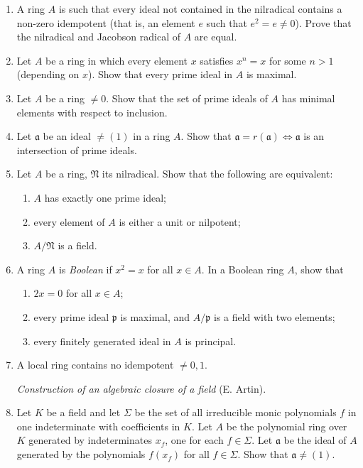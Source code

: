 \begin{enumerate}
\item A ring $A$ is such that every ideal not contained in the nilradical contains a non-zero idempotent (that is, an element $e$ such that $e^2=e\neq0$). Prove that the nilradical and Jacobson radical of $A$ are equal.

\item Let $A$ be a ring in which every element $x$ satisfies $x^n=x$ for some $n>1$ (depending on $x$). Show that every prime ideal in $A$ is maximal.

\item Let $A$ be a ring $\neq0$. Show that the set of prime ideals of $A$ has minimal elements with respect to inclusion.

\item Let $\mathfrak a$ be an ideal $\neq(1)$ in a ring $A$. Show that $\mathfrak a=r(\mathfrak a)\Longleftrightarrow\mathfrak a$ is an intersection of prime ideals.

\item Let $A$ be a ring, $\mathfrak N$ its nilradical. Show that the following are equivalent:
\begin{enumerate}
\renewcommand{\labelenumii}{\roman{enumii})}
\item $A$ has exactly one prime ideal;
\item every element of $A$ is either a unit or nilpotent;
\item $A/\mathfrak N$ is a field.
\end{enumerate}

\item A ring $A$ is \textit{Boolean} if $x^2=x$ for all $x\in A$. In a Boolean ring $A$, show that
\begin{enumerate}
\renewcommand{\labelenumii}{\roman{enumii})}
\item $2x=0$ for all $x\in A$;
\item every prime ideal $\mathfrak p$ is maximal, and $A/\mathfrak p$ is a field with two elements;
\item every finitely generated ideal in $A$ is principal.
\end{enumerate}

\item A local ring contains no idempotent $\neq0,1$.

\noindent\textit{Construction of an algebraic closure of a field} (E. Artin).

\item Let $K$ be a field and let $\Sigma$ be the set of all irreducible monic polynomials $f$ in one indeterminate with coefficients in $K$. Let $A$ be the polynomial ring over $K$ generated by indeterminates $x_f$, one for each $f\in\Sigma$. Let $\mathfrak a$ be the ideal of $A$ generated by the polynomials $f(x_f)$ for all $f\in\Sigma$. Show that $\mathfrak a\neq(1)$.


\end{enumerate}
